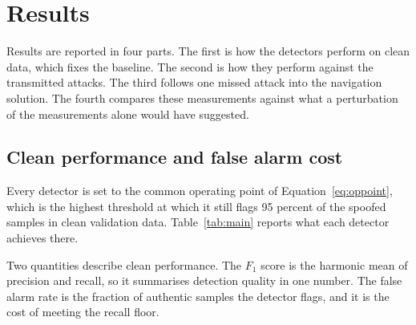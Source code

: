 \documentclass[pdflatex,sn-basic]{sn-jnl}
\theoremstyle{thmstyleone}
\theoremstyle{thmstyletwo}
\theoremstyle{thmstylethree}
\begin{document}
\section{Results}
\label{sec:results}

Results are reported in four parts. The first is how the detectors perform on clean
data, which fixes the baseline. The second is how they perform against the transmitted
attacks. The third follows one missed attack into the navigation solution. The fourth
compares these measurements against what a perturbation of the measurements alone would
have suggested.

\subsection{Clean performance and false alarm cost}
\label{sec:res_clean}

Every detector is set to the common operating point of Equation~\ref{eq:oppoint}, which
is the highest threshold at which it still flags 95 percent of the spoofed samples in
clean validation data. Table~\ref{tab:main} reports what each detector achieves there.

Two quantities describe clean performance. The $F_1$ score is the harmonic mean of
precision and recall, so it summarises detection quality in one number. The false alarm
rate is the fraction of authentic samples the detector flags, and it is the cost of
meeting the recall floor.
\end{document}
